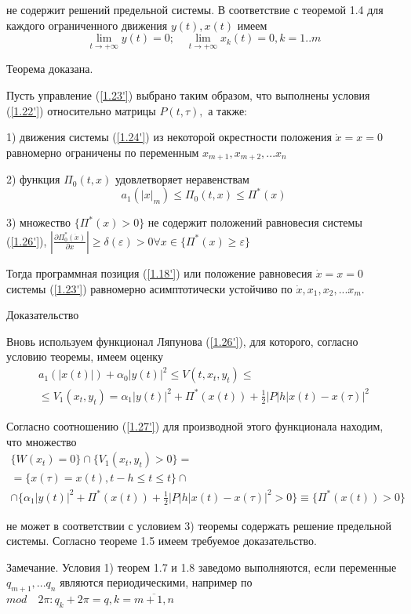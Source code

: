 не содержит решений предельной системы. В соответствие с теоремой 1.4 для каждого ограниченного движения $y(t), x(t)$ имеем
$$\lim_{t \to + \infty} y(t) = 0; \quad \lim_{t \to + \infty} x_k (t) = 0, k = 1..m$$

Теорема доказана.

\begin{theorem}\label{t-1.11}
Пусть управление (\ref{1.23'}) выбрано таким образом, что выполнены условия (\ref{1.22'}) относительно матрицы $P(t, \tau),$ а также: 

1) движения системы (\ref{1.24'}) из некоторой окрестности положения $\dot x = x = 0$ равномерно ограничены по переменным $x_{m+1}, x_{m+2},... x_n$

2) функция $\Pi_0 (t, x)$ удовлетворяет неравенствам $$a_1 (\left| x \right|_m) \le \Pi_0 (t, x) \le \Pi^{*} (x)$$

3) множество $\lbrace \Pi^{*} (x) > 0 \rbrace$ не содержит положений равновесия системы (\ref{1.26'}), $\left| \frac{\partial \Pi_0^{*} (\dot x)}{\partial x} \right| \ge \delta(\varepsilon) > 0 \forall x \in \lbrace \Pi^{*} (x) \ge \varepsilon \rbrace$

Тогда программная позиция (\ref{1.18'}) или положение равновесия $\dot x = x = 0$ системы (\ref{1.23'}) равномерно асимптотически устойчиво по $\dot x, x_1, x_2, ... x_m.$
\end{theorem}

Доказательство

Вновь используем функционал Ляпунова (\ref{1.26'}), для которого, согласно условию теоремы, имеем оценку 
$$
\begin{array}{c}
a_1 (\left| x(t) \right|) + \alpha_0 \left| y(t) \right|^2 \le V(t, x_t, y_t) \le\\
\le V_1 (x_t, y_t) = \alpha_1 \left| y(t) \right|^2 + \Pi^{*} (x(t)) + \frac12 \left| P \right| h \left| x(t) - x(\tau) \right|^2
\end{array}
$$

Согласно соотношению (\ref{1.27'}) для производной этого функционала находим, что множество
$$
\begin{array}{c}
\lbrace W (x_t) = 0 \rbrace \cap \lbrace V_1(x_t, y_t) > 0 \rbrace =\\
= \lbrace x(\tau) = x(t), t-h \le t \le t \rbrace \cap\\
\cap \{ \alpha_1 \left| y(t) \right|^2 + \Pi^{*} (x(t)) + \frac12 \left| P\right| h \left| x(t) - x(\tau) \right|^2 > 0 \rbrace \equiv \lbrace \Pi^{*} (x(t)) > 0 \}
\end{array}
$$

не может в соответствии с условием 3) теоремы содержать решение предельной системы. Согласно теореме 1.5 имеем требуемое доказательство.

Замечание. Условия 1) теорем 1.7 и 1.8 заведомо выполняются, если переменные $q_{m+1}, ... q_n$ являются периодическими, например по $mod \quad 2 \pi: q_k + 2 \pi = q, k = \overline{m + 1, n}$